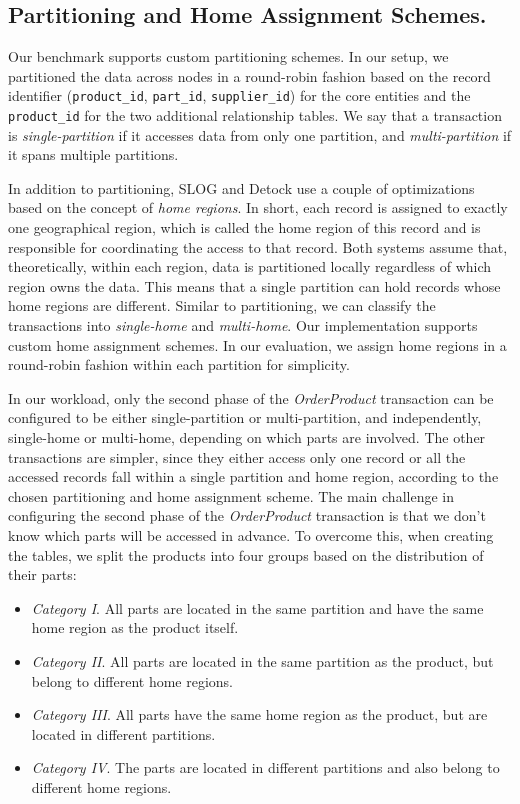 \subsection{Partitioning and Home Assignment Schemes.}
\label{subsec: partitioning-and-home-assignment-schemes}
Our benchmark supports custom partitioning schemes. In our setup, we partitioned the data across nodes in a round-robin fashion based on the record identifier (\texttt{product\_id}, \texttt{part\_id}, \texttt{supplier\_id}) for the core entities and the \texttt{product\_id} for the two additional relationship tables. We say that a transaction is \textit{single-partition} if it accesses data from only one partition, and \textit{multi-partition} if it spans multiple partitions.

In addition to partitioning, SLOG and Detock use a couple of optimizations based on the concept of \textit{home regions}. In short, each record is assigned to exactly one geographical region, which is called the home region of this record and is responsible for coordinating the access to that record. Both systems assume that, theoretically, within each region, data is partitioned locally regardless of which region owns the data. This means that a single partition can hold records whose home regions are different. Similar to partitioning, we can classify the transactions into \textit{single-home} and \textit{multi-home}. Our implementation supports custom home assignment schemes. In our evaluation, we assign home regions in a round-robin fashion within each partition for simplicity.

In our workload, only the second phase of the \textit{OrderProduct} transaction can be configured to be either single-partition or multi-partition, and independently, single-home or multi-home, depending on which parts are involved. The other transactions are simpler, since they either access only one record or all the accessed records fall within a single partition and home region, according to the chosen partitioning and home assignment scheme. The main challenge in configuring the second phase of the \textit{OrderProduct} transaction is that we don't know which parts will be accessed in advance. To overcome this, when creating the tables, we split the products into four groups based on the distribution of their parts:
\begin{itemize}
    \item \textit{Category I}. All parts are located in the same partition and have the same home region as the product itself.
    \item \textit{Category II}. All parts are located in the same partition as the product, but belong to different home regions.
    \item \textit{Category III}. All parts have the same home region as the product, but are located in different partitions.
    \item \textit{Category IV}. The parts are located in different partitions and also belong to different home regions.
\end{itemize}

